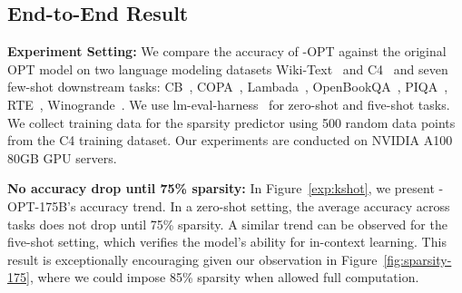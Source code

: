 \subsection{End-to-End Result}
\label{sec:main_result}

\textbf{Experiment Setting:}
We compare the accuracy of \name{}-OPT against the original OPT model on two language modeling datasets Wiki-Text~\cite{merity2016pointer} and C4~\cite{2019t5} and seven few-shot downstream tasks: CB~\cite{Marneffe2019TheCI}, COPA~\cite{gordon-etal-2012-semeval}, Lambada~\cite{radford2019language}, OpenBookQA~\cite{OpenBookQA2018}, PIQA~\cite{Bisk2020}, RTE~\cite{giampiccolo-etal-2007-third}, Winogrande~\cite{ai2:winogrande}. 
We use lm-eval-harness~\cite{eval-harness} for zero-shot and five-shot tasks.  We collect training data for the sparsity predictor using 500 random data points from the C4 training dataset. Our experiments are conducted on NVIDIA A100 80GB GPU servers.

\textbf{No accuracy drop until 75\% sparsity: } In Figure~\ref{exp:kshot}, we present \name{}-OPT-175B's accuracy trend.  In a zero-shot setting, the average accuracy across tasks does not drop until 75\% sparsity. A similar trend can be observed for the five-shot setting, which verifies the model's ability for in-context learning.  This result is exceptionally encouraging given our observation in Figure~\ref{fig:sparsity-175}, where we could impose 85\% sparsity when allowed full computation. 



